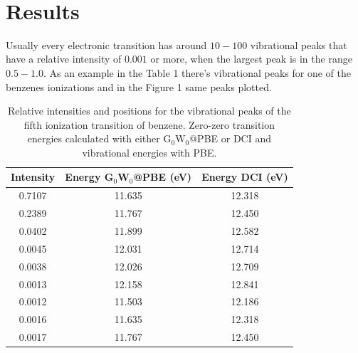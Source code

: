 \documentclass{article}
\begin{document}
~\\
\section{Results}

Usually every electronic transition has around $10-100$ vibrational peaks that have a relative intensity of $0.001$ or more, when the largest peak is in the range $0.5-1.0$. As an example in the Table 1 there's vibrational peaks for one of the benzenes ionizations and in the Figure 1 same peaks plotted.

\begin{table}[h!]
    \centering
    \begin{tabular}{c c c}
        \textbf{Intensity} & \textbf{Energy $\textbf{G}_0\textbf{W}_0$@PBE (eV)} & \textbf{Energy DCI (eV)} \\ \hline
        0.7107 & 11.635 & 12.318 \\ %
        0.2389 & 11.767 & 12.450 \\ %
        0.0402 & 11.899 & 12.582 \\ %
        0.0045 & 12.031 & 12.714 \\ %
        0.0038 & 12.026 & 12.709 \\ %
        0.0013 & 12.158 & 12.841 \\ %
        0.0012 & 11.503 & 12.186 \\ %
        0.0016 & 11.635 & 12.318 \\ %
        0.0017 & 11.767 & 12.450 \\  \hline 
    \end{tabular}
    \caption{Relative intensities and positions for the vibrational peaks of the fifth ionization transition of benzene. Zero-zero transition energies calculated with either $\text{G}_0\text{W}_0$@PBE or DCI and vibrational energies with PBE.}
\end{table}
\FloatBarrier
\end{document}
